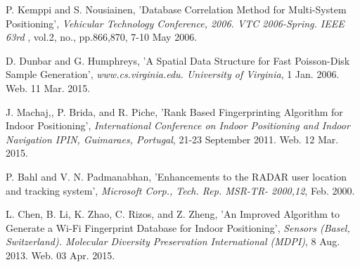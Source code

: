 \documentclass[conference]{IEEEtran}
\begin{document}
\begin{thebibliography}{99}
 P. Kemppi and S. Nousiainen,
'Database Correlation Method for Multi-System Positioning',
\emph{Vehicular Technology Conference, 2006. VTC 2006-Spring. IEEE 63rd },  vol.2, no., pp.866,870, 7-10 May 2006.

 D. Dunbar and G. Humphreys,
'A Spatial Data Structure for Fast Poisson-Disk Sample Generation',
\emph{www.cs.virginia.edu. University of Virginia},  1 Jan. 2006. Web. 11 Mar. 2015. 

 J. Machaj,, P. Brida, and R. Piche,
'Rank Based Fingerprinting Algorithm for Indoor Positioning',
\emph{ International Conference on Indoor Positioning and Indoor Navigation IPIN, Guimaraes, Portugal},  21-23 September 2011. Web. 12 Mar. 2015.

 P. Bahl and V. N. Padmanabhan,
'Enhancements to the RADAR user location and tracking system',
\emph{Microsoft Corp., Tech. Rep. MSR-TR- 2000,12}, Feb. 2000.

 L. Chen, B. Li, K. Zhao, C. Rizos, and Z. Zheng,
'An Improved Algorithm to Generate a Wi-Fi Fingerprint Database for Indoor Positioning',
\emph{Sensors (Basel, Switzerland). Molecular Diversity Preservation International (MDPI)}, 8 Aug. 2013. Web. 03 Apr. 2015.


\end{thebibliography}
\end{document}
